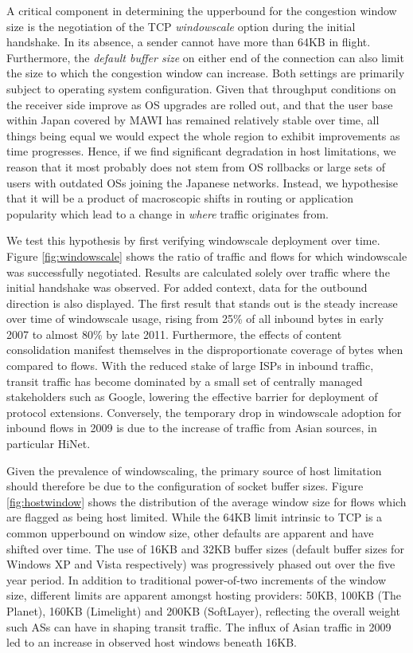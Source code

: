 A critical component in determining the upperbound for the congestion window size is the negotiation of the \ac{TCP} \emph{windowscale} option during the initial handshake. 
In its absence, a sender cannot have more than 64KB in flight.
Furthermore, the \emph{default buffer size} on either end of the connection can also limit the size to which the congestion window can increase.
Both settings are primarily subject to operating system configuration.
Given that throughput conditions on the receiver side improve as \ac{OS} upgrades are rolled out, and that the user base within Japan covered by \ac{MAWI} has remained relatively stable over time, all things being equal we would expect the whole region to exhibit improvements as time progresses. 
Hence, if we find significant degradation in host limitations, we reason that it most probably does not stem from \ac{OS} rollbacks or large sets of users with outdated \acp{OS} joining the Japanese networks. 
Instead, we hypothesise that it will be a product of macroscopic shifts in routing or application popularity which lead to a change in \emph{where} traffic originates from.

We test this hypothesis by first verifying windowscale deployment over time.
Figure \ref{fig:windowscale} shows the ratio of traffic and flows for which windowscale was successfully negotiated.
Results are calculated solely over traffic where the initial handshake was observed.
For added context, data for the outbound direction is also displayed.
The first result that stands out is the steady increase over time of windowscale usage, rising from 25\% of all inbound bytes in early 2007 to almost 80\% by late 2011.
Furthermore, the effects of content consolidation manifest themselves in the disproportionate coverage of bytes when compared to flows.
With the reduced stake of large \acp{ISP} in inbound traffic, transit traffic has become dominated by a small set of centrally managed stakeholders such as Google, lowering the effective barrier for deployment of protocol extensions.
Conversely, the temporary drop in windowscale adoption for inbound flows in 2009 is due to the increase of traffic from Asian sources, in particular HiNet.

Given the prevalence of windowscaling, the primary source of host limitation should therefore be due to the configuration of socket buffer sizes.
Figure \ref{fig:hostwindow} shows the distribution of the average window size for flows which are flagged as being host limited.
While the 64KB limit intrinsic to \ac{TCP} is a common upperbound on window size, other defaults are apparent and have shifted over time.
The use of 16KB and 32KB buffer sizes (default buffer sizes for Windows XP and Vista respectively) was progressively phased out over the five year period.
In addition to traditional power-of-two increments of the window size, different limits are apparent amongst hosting providers: 50KB, 100KB (The Planet), 160KB (Limelight) and 200KB (SoftLayer), reflecting the overall weight such \acp{AS} can have in shaping transit traffic.
The influx of Asian traffic in 2009 led to an increase in observed host windows beneath 16KB.

